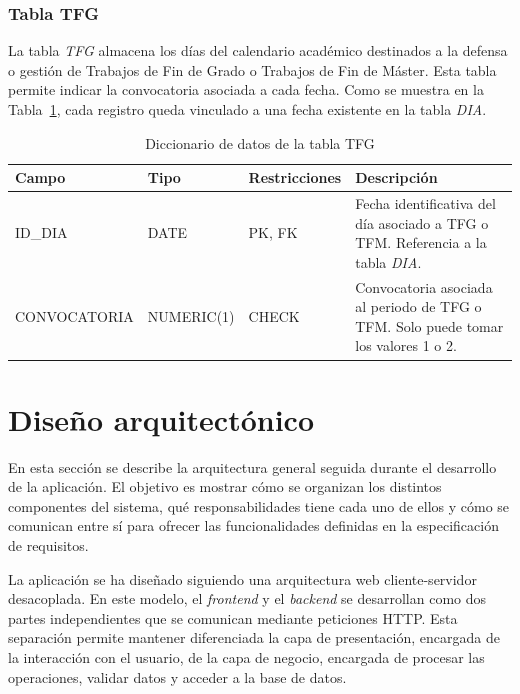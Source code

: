 \subsubsection{Tabla TFG}

\noindent La tabla \textit{TFG} almacena los días del calendario académico destinados a la defensa o gestión de Trabajos de Fin de Grado o Trabajos de Fin de Máster. Esta tabla permite indicar la convocatoria asociada a cada fecha. Como se muestra en la Tabla~\ref{tab:diccionario-tfg}, cada registro queda vinculado a una fecha existente en la tabla \textit{DIA}.\\

\begin{table}[H]
	\centering
	\scriptsize
	\setlength{\tabcolsep}{3pt}
	\renewcommand{\arraystretch}{1.15}
	\begin{tabularx}{\textwidth}{@{}
			>{\raggedright\arraybackslash}p{2.6cm}
			>{\raggedright\arraybackslash}p{2.2cm}
			>{\raggedright\arraybackslash}p{2.2cm}
			X@{}}
		\toprule
		\textbf{Campo} & \textbf{Tipo} & \textbf{Restricciones} & \textbf{Descripción} \\
		\midrule
		ID\_DIA & DATE & PK, FK & Fecha identificativa del día asociado a TFG o TFM. Referencia a la tabla \textit{DIA}. \\
		CONVOCATORIA & NUMERIC(1) & CHECK & Convocatoria asociada al periodo de TFG o TFM. Solo puede tomar los valores 1 o 2. \\
		\bottomrule
	\end{tabularx}
	\caption{Diccionario de datos de la tabla TFG}
	\label{tab:diccionario-tfg}
\end{table}



\section{Diseño arquitectónico}

En esta sección se describe la arquitectura general seguida durante el desarrollo de la aplicación. El objetivo es mostrar cómo se organizan los distintos componentes del sistema, qué responsabilidades tiene cada uno de ellos y cómo se comunican entre sí para ofrecer las funcionalidades definidas en la especificación de requisitos.

La aplicación se ha diseñado siguiendo una arquitectura web cliente-servidor desacoplada. En este modelo, el \textit{frontend} y el \textit{backend} se desarrollan como dos partes independientes que se comunican mediante peticiones HTTP. Esta separación permite mantener diferenciada la capa de presentación, encargada de la interacción con el usuario, de la capa de negocio, encargada de procesar las operaciones, validar datos y acceder a la base de datos.

